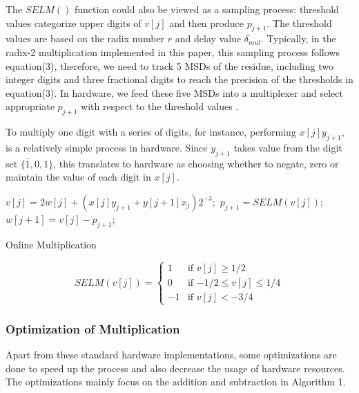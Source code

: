 \documentclass{sig-alternate}
\begin{document}
	The $SELM()$ function could also be viewed as a sampling process: threshold values categorize upper digits of $v[j]$ and then produce $p_{j+1}$. The threshold values are based on the radix number $r$ and delay value $\delta_{mul}$\cite{online_mul}. Typically, in the radix-2 multiplication implemented in this paper, this sampling process follows equation(3), therefore, we need to track 5 MSDs of the residue, including two integer digits and three fractional digits to reach the precision of the thresholds in equation(3). In hardware, we feed these five MSDs into a multiplexer and select appropriate $p_{j+1}$ with respect to the threshold values \cite{online_mul}. 
	
	
	To multiply one digit with a series of digits, for instance, performing $x[j]y_{j+1}$, is a relatively simple process in hardware. Since $y_{j+1}$ takes value from the digit set $\{\bar{1},0,1\}$, this translates to hardware as choosing whether to negate, zero or maintain the value of each digit in $x[j]$.   
		  
	\begin{algorithm}
		\begin{algorithmic}[1]
			\newline
	
				\State $v[j] = 2w[j] + (x[j]y_{j+1}+y[j+1]x_{j})2^{-3};$
				\State $p_{j+1} = SELM(v[j]);$
				\State $w[j+1] = v[j] - p_{j+1};$
			\EndFor
		\end{algorithmic}
		\caption{Online Multiplication}
		\label{alg:algorithm1}
	\end{algorithm}	
	\begin{equation}
		SELM (v[j]) = \begin{cases}
		1 &\text{if $v[j] \geq 1/2$}\\
		0 &\text{if $-1/2 \leq v[j] \leq1/4$}\\
		-1 &\text{if $v[j]<-3/4$ }
		\end{cases} 
	\end{equation}
	\subsubsection{Optimization of Multiplication}
	Apart from these standard hardware implementations, some optimizations are done to speed up the process and also decrease the usage of hardware resources. The optimizations mainly focus on the addition and subtraction in Algorithm 1.
	
\end{document}
